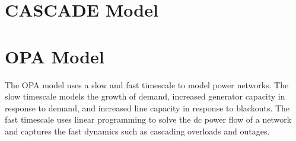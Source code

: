 \chapter{CASCADE Model}

\chapter{OPA Model}
The OPA model uses a slow and fast timescale to model power networks.\cite{carreras2004complex} The slow timescale models the growth of demand, increased generator capacity in response to demand, and increased line capacity in response to blackouts. The fast timescale uses linear programming to solve the dc power flow of a network and captures the fast dynamics such as cascading overloads and outages.\cite{carreras2004complex}
